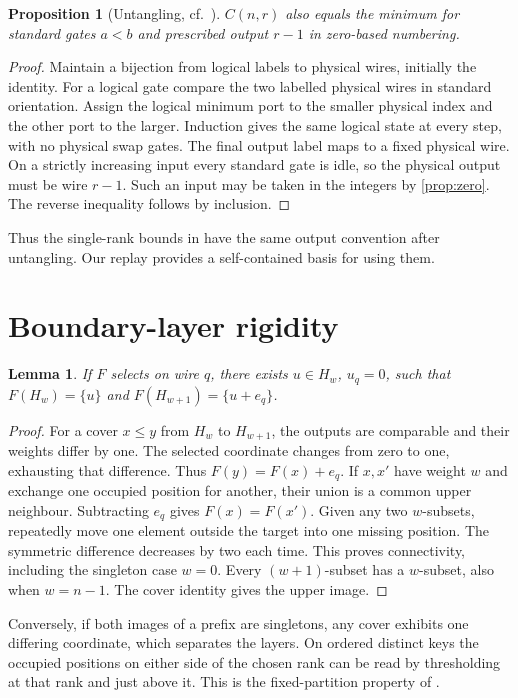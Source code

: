 \documentclass[11pt,reqno]{amsart}
\newtheorem{lemma}[theorem]{Lemma}
\newtheorem{proposition}[theorem]{Proposition}
\begin{document}
\begin{proposition}[Untangling, cf.\ {\cite[Section 2]{tomar}}]\label{prop:untangle}
$C(n,r)$ also equals the minimum for standard gates $a<b$ and prescribed
output $r-1$ in zero-based numbering.
\end{proposition}
\begin{proof}
Maintain a bijection from logical labels to physical wires, initially the
identity. For a logical gate compare the two labelled physical wires in
standard orientation. Assign the logical minimum port to the smaller
physical index and the other port to the larger. Induction gives the same
logical state at every step, with no physical swap gates. The final output
label maps to a fixed physical wire. On a strictly increasing input every
standard gate is idle, so the physical output must be wire $r-1$. Such
an input may be taken in the integers by \cref{prop:zero}. The reverse
inequality follows by inclusion.
\end{proof}
Thus the single-rank bounds in \cite{gsi} have the same output convention
after untangling. Our replay provides a self-contained basis for using them.

\section{Boundary-layer rigidity}
\begin{lemma}\label{lem:rigid}
If $F$ selects on wire $q$, there exists $u\in H_w$, $u_q=0$, such that
$F(H_w)=\{u\}$ and $F(H_{w+1})=\{u+e_q\}$.
\end{lemma}
\begin{proof}
For a cover $x\le y$ from $H_w$ to $H_{w+1}$, the outputs are comparable
and their weights differ by one. The selected coordinate changes from zero
to one, exhausting that difference. Thus $F(y)=F(x)+e_q$.
If $x,x'$ have weight $w$ and exchange one occupied position for another,
their union is a common upper neighbour. Subtracting $e_q$ gives
$F(x)=F(x')$. Given any two $w$-subsets, repeatedly move one element
outside the target into one missing position. The symmetric difference
decreases by two each time. This proves connectivity, including the
singleton case $w=0$. Every $(w+1)$-subset has a $w$-subset, also when
$w=n-1$. The cover identity gives the upper image.
\end{proof}
Conversely, if both images of a prefix are singletons, any cover exhibits
one differing coordinate, which separates the layers. On ordered distinct
keys the occupied positions on either side of the chosen rank can be read
by thresholding at that rank and just above it. This is the fixed-partition
property of \cite{afshani}.
\end{document}
